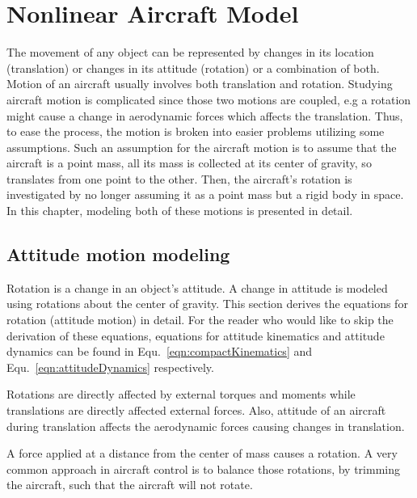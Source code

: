 \chapter{Nonlinear Aircraft Model}

The movement of any object can be represented by changes in its location (translation) or changes in its attitude (rotation) or a combination of both. 
Motion of an aircraft usually involves both translation and rotation. 
Studying aircraft motion is complicated since those two motions are coupled, e.g a rotation might cause a change in aerodynamic forces which affects the translation. 
Thus, to ease the process, the motion is broken into easier problems utilizing some assumptions. 
Such an assumption for the aircraft motion is to assume that the aircraft is a point mass, all its mass is collected at its center of gravity, so translates from one point to the other. 
Then, the aircraft's rotation is investigated by no longer assuming it as a point mass but a rigid body in space.
In this chapter, modeling both of these motions is presented in detail.
  
\section{Attitude motion modeling}

Rotation is a change in an object's attitude. 
A change in attitude is modeled using rotations about the center of gravity.  
This section derives the equations for rotation (attitude motion) in detail. 
For the reader who would like to skip the derivation of these equations, equations for attitude kinematics and attitude dynamics can be found in Equ.~\ref{eqn:compactKinematics} and Equ.~\ref{eqn:attitudeDynamics} respectively.

Rotations are directly affected by external torques and moments while translations are directly affected external forces. 
Also, attitude of an aircraft during translation affects the aerodynamic forces causing changes in translation.

A force applied at a distance from the center of mass causes a rotation.
A very common approach in aircraft control is to balance those rotations, by trimming the aircraft, such that the aircraft will not rotate.

